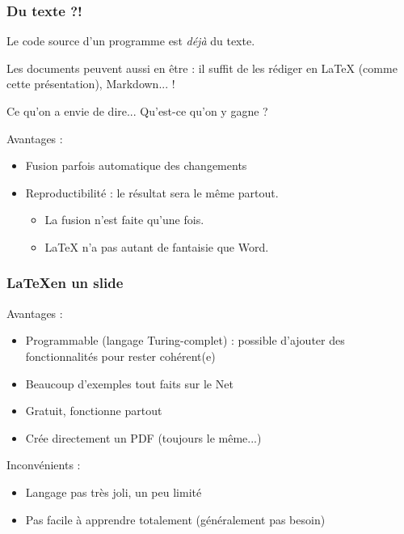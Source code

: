 \documentclass[compress]{beamer}
\newenvironment{envie}
	{\begin{block}{Ce qu'on a envie de dire...}}
	{\end{block}}
\begin{document}
\begin{frame}
	\frametitle{Du texte ?!}
	Le code source d'un programme est \emph{déjà} du texte.
	\pause

	Les documents peuvent aussi en être : il suffit de les rédiger en
	\LaTeX{} (comme cette présentation), Markdown... !
	\pause

	\begin{envie}
		Qu'est-ce qu'on y gagne ? \pause
	\end{envie}

	Avantages :
	\begin{itemize}
		\item Fusion parfois automatique des changements \pause
		\item Reproductibilité : le résultat sera le même partout. \pause
			\begin{itemize}
				\item La fusion n'est faite qu'une fois. \pause
				\item \LaTeX{} n'a pas autant de fantaisie que Word.
			\end{itemize}
	\end{itemize}
\end{frame}

\begin{frame}
	\frametitle{\LaTeX en un slide}
	Avantages :
	\begin{itemize}
		\item Programmable (langage Turing-complet) :
			possible d'ajouter des fonctionnalités pour rester cohérent(e)
		\item Beaucoup d'exemples tout faits sur le Net
		\item Gratuit, fonctionne partout
		\item Crée directement un PDF (toujours le même...)
	\end{itemize}
	Inconvénients :
	\begin{itemize}
		\item Langage pas très joli, un peu limité
		\item Pas facile à apprendre totalement (généralement pas besoin)
	\end{itemize}
\end{frame}
\end{document}
